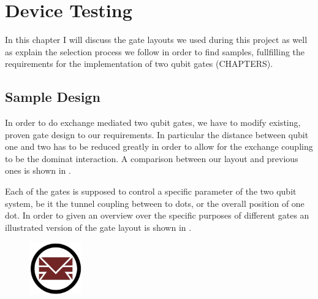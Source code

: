 \chapter{Device Testing}

In this chapter I will discuss the gate layouts we used during this project as well as explain the selection process we follow in order to find samples, fullfilling the requirements for the implementation of two qubit gates (CHAPTERS).
\section{Sample Design}
In order to do exchange mediated two qubit gates, we have to modify existing, proven gate design to our requirements. In particular the distance between qubit one and two has to be reduced greatly in order to allow for the exchange coupling to be the dominat interaction. A comparison between our layout and previous ones is shown in .
\begin{figure}[htbp] 
  \centering
  \caption{}
  \label{fig:layout_comp}
\end{figure}
Each of the gates is supposed to control a specific parameter of the two qubit system, be it the tunnel coupling between to dots, or the overall position of one dot. In order to given an overview over the specific purposes of different gates an illustrated version of the gate layout is shown in .

\begin{figure}[htbp]\centering
     \centering
     \includegraphics[width=0.2\textwidth]{./pictures/dummy}
     \caption{}
     \label{fig:colorful_gatelayout}
 \end{figure}
 
